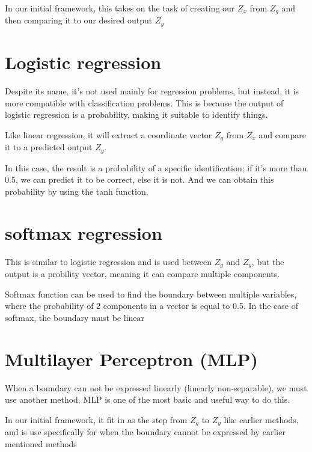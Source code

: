\documentclass{article}
\begin{document}
In our initial framework, this takes on the task of creating our $Z_x$ from $Z_g$ and then comparing it to our desired output $Z_y$
\section{Logistic regression}

Despite its name, it's not used mainly for regression problems, but instead, it is more compatible with classification problems. This is because the output of logistic regression is  a probability, making it suitable to identify things. 

Like linear regression, it will extract a coordinate vector $Z_g$ from $Z_x$ and compare it to a predicted output $Z_y$.

In this case, the result is a probability of a specific identification; if it's more than 0.5, we can predict it to be correct, else it is not. And we can obtain this probability by using the tanh function.

\section{softmax regression}
This is similar to logistic regression and is used between $Z_g$ and $Z_y$, but the output is a probility vector, meaning it can compare multiple components.

Softmax function can be used to find the boundary between multiple variables, where the probability of 2 components in a vector is equal to 0.5. In the case of softmax, the boundary must be linear


\section{Multilayer Perceptron (MLP)}
When a boundary can not be expressed linearly (linearly non-separable), we must use another method. MLP is one of the most basic and useful way to do this.

In our initial framework, it fit in as the step from $Z_g$ to $Z_y$ like earlier methods, and is use specifically for when the boundary cannot be expressed by earlier mentioned methods
\end{document}

